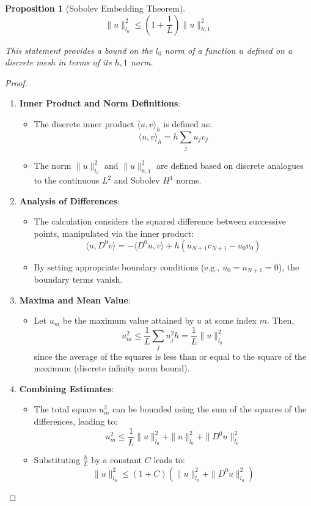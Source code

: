 \documentclass[11pt,a4paper]{article}
\theoremstyle{plain}
\newtheorem{proposition}[theorem]{Proposition}
\theoremstyle{definition}
\theoremstyle{remark}
\begin{document}
\begin{proposition}[Sobolev Embedding Theorem]
\[ \|u\|_{l_0}^2 \leq \left(1 + \frac{1}{L}\right) \|u\|_{h,1}^2 \]

This statement provides a bound on the \(l_0\) norm of a function \(u\) defined on a discrete mesh in terms of its \(h,1\) norm.
\end{proposition}
\begin{proof}
\begin{enumerate}
    \item \textbf{Inner Product and Norm Definitions}:
    \begin{itemize}
        \item The discrete inner product $\langle u, v \rangle_h$ is defined as:
        \[ \langle u, v \rangle_h = h \sum_{j} u_j v_j \]
        \item The norm $\|u\|_{l_0}^2$ and $\|u\|_{h,1}^2$ are defined based on discrete analogues to the continuous $L^2$ and Sobolev $H^1$ norms.
    \end{itemize}
    
    \item \textbf{Analysis of Differences}:
    \begin{itemize}
        \item The calculation considers the squared difference between successive points, manipulated via the inner product:
        \[ \langle u, D^0 v \rangle = -\langle D^0 u, v \rangle + h(u_{N+1}v_{N+1} - u_0v_0) \]
        \item By setting appropriate boundary conditions (e.g., $u_0 = u_{N+1} = 0$), the boundary terms vanish.
    \end{itemize}
    
    \item \textbf{Maxima and Mean Value}:
    \begin{itemize}
        \item Let $u_m$ be the maximum value attained by $u$ at some index $m$. Then,
        \[ u_m^2 \leq \frac{1}{L} \sum_{j} u_j^2 h = \frac{1}{L} \|u\|_{l_0}^2 \]
        since the average of the squares is less than or equal to the square of the maximum (discrete infinity norm bound).
    \end{itemize}
    
    \item \textbf{Combining Estimates}:
    \begin{itemize}
        \item The total square $u_m^2$ can be bounded using the sum of the squares of the differences, leading to:
        \[ u_m^2 \leq \frac{1}{L} \|u\|_{l_0}^2 + \|u\|_{l_0}^2 + \|D^0 u\|_{l_0}^2 \]
        \item Substituting $\frac{h}{L}$ by a constant $C$ leads to:
        \[ \|u\|_{l_0}^2 \leq (1 + C) (\|u\|_{l_0}^2 + \|D^0 u\|_{l_0}^2) \]
    \end{itemize}
    

\end{enumerate}
\end{proof}
\end{document}
